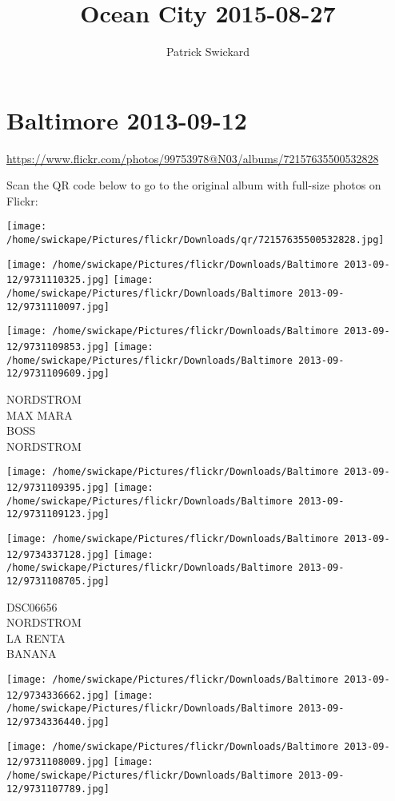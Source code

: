 \documentclass[10pt,letterpaper]{article}
\title{Ocean City 2015-08-27}
\author{Patrick Swickard}
\date{}
\begin{document}
\section*{Baltimore 2013-09-12}

\url{https://www.flickr.com/photos/99753978@N03/albums/72157635500532828}

Scan the QR code below to go to the original album with full-size photos on Flickr:

\texttt{[image: /home/swickape/Pictures/flickr/Downloads/qr/72157635500532828.jpg]}
\pagebreak

\texttt{[image: /home/swickape/Pictures/flickr/Downloads/Baltimore 2013-09-12/9731110325.jpg]}
\texttt{[image: /home/swickape/Pictures/flickr/Downloads/Baltimore 2013-09-12/9731110097.jpg]}

\texttt{[image: /home/swickape/Pictures/flickr/Downloads/Baltimore 2013-09-12/9731109853.jpg]}
\texttt{[image: /home/swickape/Pictures/flickr/Downloads/Baltimore 2013-09-12/9731109609.jpg]}

NORDSTROM\\
MAX MARA\\
BOSS\\
NORDSTROM
\pagebreak

\texttt{[image: /home/swickape/Pictures/flickr/Downloads/Baltimore 2013-09-12/9731109395.jpg]}
\texttt{[image: /home/swickape/Pictures/flickr/Downloads/Baltimore 2013-09-12/9731109123.jpg]}

\texttt{[image: /home/swickape/Pictures/flickr/Downloads/Baltimore 2013-09-12/9734337128.jpg]}
\texttt{[image: /home/swickape/Pictures/flickr/Downloads/Baltimore 2013-09-12/9731108705.jpg]}

DSC06656\\
NORDSTROM\\
LA RENTA\\
BANANA
\pagebreak

\texttt{[image: /home/swickape/Pictures/flickr/Downloads/Baltimore 2013-09-12/9734336662.jpg]}
\texttt{[image: /home/swickape/Pictures/flickr/Downloads/Baltimore 2013-09-12/9734336440.jpg]}

\texttt{[image: /home/swickape/Pictures/flickr/Downloads/Baltimore 2013-09-12/9731108009.jpg]}
\texttt{[image: /home/swickape/Pictures/flickr/Downloads/Baltimore 2013-09-12/9731107789.jpg]}
\end{document}
